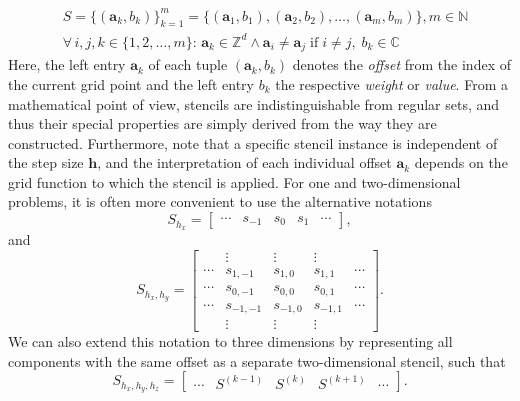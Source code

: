 \begin{equation}
	\begin{split}
			& S = \{(\bm{a}_k, b_k) \}_{k=1}^m = \{(\bm{a}_1, b_1),  (\bm{a}_2, b_2), \dots, (\bm{a}_m, b_m)\}, m \in \mathbb{N}
	\\ & \forall \, i, j, k \in \{1, 2, \dots, m \}: \,
	\bm{a}_k \in \mathbb{Z}^d \wedge \bm{a}_i \neq \bm{a}_j \; \text{if} \; i \neq j, \; b_k \in \mathbb{C}
	\end{split}
\label{eq:stencil-definition}
\end{equation}
Here, the left entry $\bm{a}_k$ of each tuple $(\bm{a}_k, b_k)$ denotes the \emph{offset} from the index of the current grid point and the left entry $b_k$ the respective \emph{weight} or \emph{value}.
From a mathematical point of view, stencils are indistinguishable from regular sets, and thus their special properties are simply derived from the way they are constructed.
Furthermore, note that a specific stencil instance is independent of the step size $\bm{h}$, and the interpretation of each individual offset $\bm{a}_k$ depends on the grid function to which the stencil is applied.
For one and two-dimensional problems, it is often more convenient to use the alternative notations 
\begin{equation}
	S_{h_x} = \begin{bmatrix}
		\cdots & s_{-1} & s_{0} & s_{1} & \cdots
	\end{bmatrix},
\end{equation}
and
\begin{equation}
	S_{h_x, h_y} = \begin{bmatrix}
		& \vdots & \vdots & \vdots & \\
		\cdots & s_{1,-1} & s_{1,0} & s_{1,1} & \cdots \\
		\cdots & s_{0,-1} & s_{0,0} & s_{0,1} & \cdots \\
		\cdots & s_{-1,-1} & s_{-1,0} & s_{-1,1} & \cdots \\
		& \vdots & \vdots & \vdots &
	\end{bmatrix}.
\end{equation}
We can also extend this notation to three dimensions by representing all components with the same offset as a separate two-dimensional stencil, such that
\begin{equation}
	S_{h_x, h_y, h_z} = 
	\begin{bmatrix}
		\cdots & S^{(k-1)} & S^{(k)} & S^{(k+1)} & \cdots 
	\end{bmatrix}.
\label{eq:3D-stencil-matrix-notation}
\end{equation}

